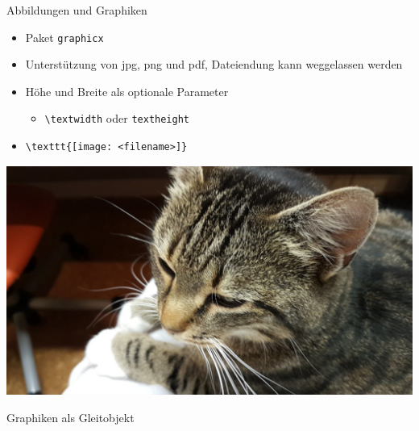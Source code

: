 \documentclass[presentation,aspectratio=169]{beamer}
\begin{document}
\begin{frame}[fragile]{Abbildungen und Graphiken}
  \begin{itemize}
    \item Paket \verb|graphicx|
    \item Unterstützung von jpg, png und pdf, Dateiendung kann weggelassen werden
    \item Höhe und Breite als optionale Parameter
      \begin{itemize}
        \item \verb|\textwidth| oder \verb|textheight|
      \end{itemize}
    \item
      \begin{verbatim}
\texttt{[image: <filename>]}
      \end{verbatim}
  \end{itemize}
  \begin{center}
    \includegraphics[height=.5\textheight]{katze}
  \end{center}
\end{frame}

\begin{frame}{Graphiken als Gleitobjekt}
  \begin{columns}
    \begin{column}{.4\textwidth}
      
    \end{column}
    \begin{column}{.5\textwidth}
      \inputminted{latex}{codebeispiele/graphics-figure.tex}
    \end{column}
  \end{columns}
\end{frame}
\end{document}
